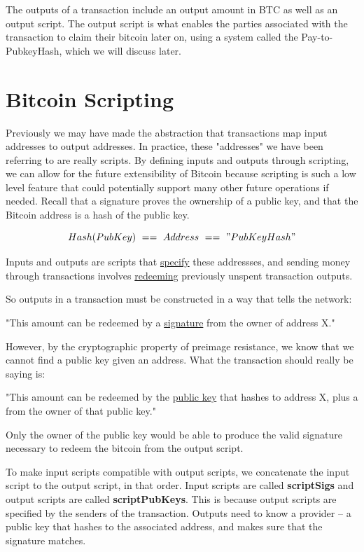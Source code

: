 \documentclass[full.tex]{subfiles}
\begin{document}
   The outputs of a transaction include an output amount in BTC as well as an output script. The output script is what enables the parties associated with the transaction to claim their bitcoin later on, using a system called the Pay-to-PubkeyHash, which we will discuss later.
   
   \section*{Bitcoin Scripting}
   
   Previously we may have made the abstraction that transactions map input addresses to output addresses. In practice, these "addresses" we have been referring to are really scripts. By defining inputs and outputs through scripting, we can allow for the future extensibility of Bitcoin because scripting is such a low level feature that could potentially support many other future operations if needed. Recall that a signature proves the ownership of a public key, and that the Bitcoin address is a hash of the public key.
   
   $$Hash(PubKey)~==~Address~==~"PubKeyHash"$$
   
   Inputs and outputs are scripts that \underline{specify} these addressses, and sending money through transactions involves \underline{redeeming} previously unspent transaction outputs.
   
   So outputs in a transaction must be constructed in a way that tells the network:
   
   "This amount can be redeemed by a \underline{signature} from the owner of address X." 
   
   However, by the cryptographic property of preimage resistance, we know that we cannot find a public key given an address. What the transaction should really be saying is:
   
   "This amount can be redeemed by the \underline{public key} that hashes to address X, plus a  from the owner of that public key."
   
   Only the owner of the public key would be able to produce the valid signature necessary to redeem the bitcoin from the output script.
   
   To make input scripts compatible with output scripts, we concatenate the input script to the output script, in that order. Input scripts are called \textbf{scriptSigs} and output scripts are called \textbf{scriptPubKeys}. This is because output scripts are specified by the senders of the transaction. Outputs need to know a provider -- a public key that hashes to the associated address, and makes sure that the signature matches.
   
\end{document}
